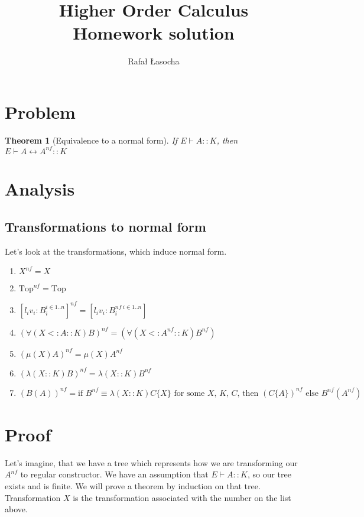 \documentclass[a4paper,11pt]{article}
\title{
  \textbf{Higher Order Calculus}\\
  {\Large Homework solution}
}
\author{Rafał Łasocha}
\newtheorem{theorem}{Theorem}
\newcommand{\nf}[1]{#1^{nf}}
\newcommand{\ttop}{\text{Top}}
\theoremstyle{definition}
\begin{document}
\maketitle

\section{Problem}

\begin{theorem}[Equivalence to a normal form]

If $E \vdash A :: K$, then $E \vdash A \leftrightarrow A^{nf} :: K$

\end{theorem}

\section{Analysis}

\subsection{Transformations to normal form}
Let's look at the transformations, which induce normal form.
\begin{enumerate}
 \item $\nf{X} = X$
 \item $\nf{\ttop} = \ttop$
 \item $\nf{[l_iv_i:B_i^{i \in 1 .. n}]} = [l_iv_i:B_i^{nf\ i \in 1 .. n}]$
 \item $\nf{(\forall(X <: A :: K)B)} = (\forall(X <: \nf{A} :: K)\nf{B})$
 \item $\nf{(\mu(X)A)} = \mu(X)\nf{A}$
 \item $\nf{(\lambda(X::K)B)} = \lambda(X::K)\nf{B}$
 \item $\nf{(B(A))} = \text{if } \nf{B} \equiv \lambda(X::K)C\{X\} \text{ for some $X$, $K$, $C$, then } \nf{(C\{A\})} \text{ else } \nf{B}(\nf{A})$
\end{enumerate}

\setcounter{case}{0}
\section{Proof}
Let's imagine, that we have a tree which represents how we are transforming our $\nf{A}$ to regular constructor.
We have an assumption that $E \vdash A :: K$, so our tree exists and is finite.
We will prove a theorem by induction on that tree. Transformation $X$ is the transformation associated with the number on the list above.
\end{document}
